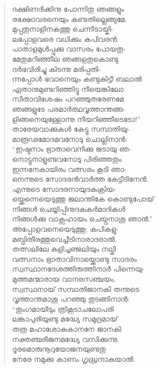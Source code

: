 \begin{verse}
ദക്ഷിണദിക്കിനു പോന്നിതു ഞങ്ങളും\\
രക്ഷോവരനെയും കണ്ടതില്ലെങ്ങുമേ.\\
മുപ്പതുനാളിനകത്തു ചെന്നീടായ്കി-\\
ലപ്പോളവരെ വധിക്കും കപിവരന്‍.\\
പാതാളമുള്‍പ്പുക്കു വാസരം പോയതു-\\
മേതുമറിഞ്ഞീല ഞങ്ങളതുകൊണ്ടു\\
ദര്‍ഭവിരിച്ചു കിടന്നു മരിപ്പതി-\\
ന്നപ്പോള്‍ ഭവാനെയും കണ്ടുകിട്ടീ ബലാല്‍\\
ഏതാനുമുണ്ടറിഞ്ഞിട്ടു നീയെങ്കിലോ\\
സീതാവിശേഷം പറഞ്ഞുതരേണമേ\\
ഞങ്ങളുടേ പരമാര്‍ത്ഥവൃത്താന്തങ്ങ-\\
ളിങ്ങനെയുള്ളോന്നു നീയറിഞ്ഞീടെടോ!”\\
താരേയവാക്കുകള്‍ കേട്ടു സമ്പാതിയു-\\
മാരൂഢമോദമവനോടു ചൊല്ലിനാന്‍:\\
“ഇഷ്ടനാം ഭ്രാതാവെനിക്കു ജടായു ഞ-\\
നൊട്ടുനാളുണ്ടവനോടു പിരിഞ്ഞതും\\
ഇന്നനേകായിരം വത്സരം കൂടി ഞാ-\\
നെന്നുടെ സോദരന്‍വാര്‍ത്ത കേട്ടീടിനേന്‍.\\
എന്നുടെ സോദരനായുദകക്രിയ-\\
യ്ക്കെന്നെയെടുത്തു ജലാന്തികേ കൊണ്ടുപോയ്\\
നിങ്ങള്‍ ചെയ്യിപ്പിനുദകകര്‍മാദികള്‍\\
നിങ്ങള്‍ക്കു വാക്സഹായം ചെയ്വനാശു ഞാന്‍.”\\
അപ്പോളവനെയെടുത്തു; കപികളു-\\
മബ്ധിതീരത്തുവെച്ചീടിനാരാദരാല്‍.\\
തത്സലിലേ കുളിച്ചഞ്ജലിയും നല്കി\\
വത്സനാം ഭ്രാതാവിനായ്ക്കൊണ്ടു സാദരം\\
സ്വസ്ഥാനദേശത്തിരുത്തിനാര്‍ പിന്നെയു-\\
മുത്തമന്മാരായ വാനരസഞ്ചയം.\\
സ്വസ്ഥനായ് സമ്പാതിജാനകി തന്നുടെ\\
വൃത്താന്തമാശു പറഞ്ഞു തുടങ്ങിനാന്‍:\\
“തുംഗമായീടും ത്രികൂടാചലോപരി\\
ലങ്കാപുരിയുണ്ടു മദ്ധ്യേ സമുദ്രമായ്\\
തത്ര മഹാശോകകാനനേ ജാനകി\\
നക്തഞ്ചരീജനമദ്ധ്യേ വസിക്കുന്നു.\\
ദൂരമൊരുനൂറുയോജനയുണ്ടതു\\
നേരേ നമുക്കു കാണം ഗൃദ്ധ്രനാകയാല്‍.\\

\end{verse}
